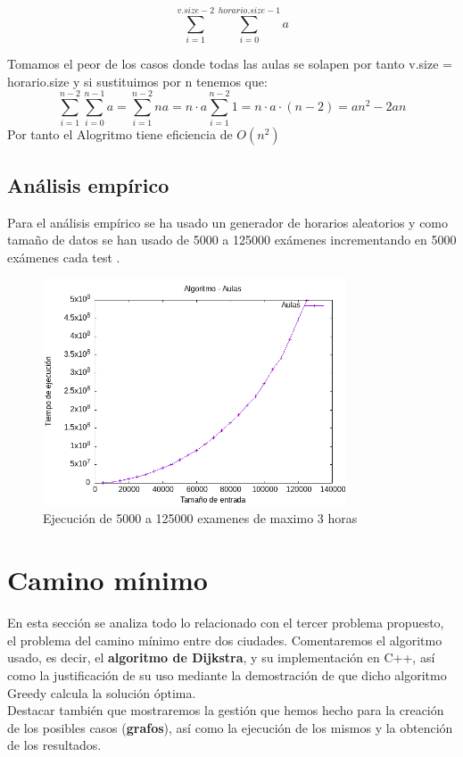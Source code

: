 \documentclass[11pt,openany]{book}
\begin{document}
\begin{equation*}
      \sum_{i=1}^{v.size -2} \sum_{i=0}^{horario.size -1}  a
\end{equation*}

Tomamos el peor de los casos donde todas las aulas se solapen 
por tanto v.size = horario.size y si sustituimos por n tenemos que:
\begin{equation*}
      \sum_{i=1}^{n -2} \sum_{i=0}^{n-1}  a = \sum_{i=1}^{n -2} na = n\cdot a \sum_{i=1}^{n -2} 1 = n\cdot a \cdot (n-2) = an^2 -2an
\end{equation*}
Por tanto el Alogritmo tiene eficiencia de $O(n^2)$

\section{Análisis empírico}
Para el análisis empírico se ha usado un generador de horarios 
aleatorios y como tamaño de datos se han usado de 5000 a 125000
exámenes incrementando en 5000 exámenes cada test .

\begin{figure}[H]
      \centering
      \includegraphics[width=0.8\textwidth]{assets/Img/Aulas.png}
      \caption{Ejecución de 5000 a 125000 examenes de maximo 3 horas}
\end{figure}


\chapter{Camino mínimo} %
En esta sección se analiza todo lo relacionado con el tercer problema propuesto, el problema del camino mínimo entre dos ciudades. 
Comentaremos el algoritmo usado, es decir, el \textbf{algoritmo de Dijkstra}, y su implementación en C++, así como la justificación de su uso mediante
la demostración de que dicho algoritmo Greedy calcula la solución óptima.  \\
Destacar también que mostraremos la gestión que hemos hecho para la creación de los posibles casos (\textbf{grafos}), así como la 
ejecución de los mismos y la obtención de los resultados.
\end{document}
